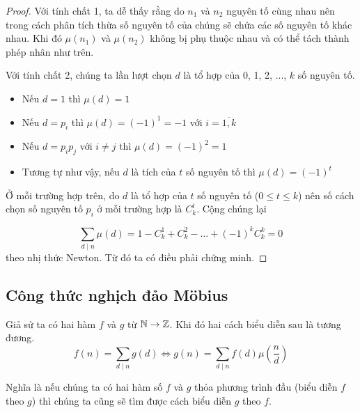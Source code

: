 \begin{proof}
    Với tính chất 1, ta dễ thấy rằng do $n_1$ và $n_2$ nguyên tố cùng nhau nên trong
    cách phân tích thừa số nguyên tố của chúng sẽ chứa các số nguyên tố khác nhau. 
    Khi đó $\mu(n_1)$ và $\mu(n_2)$ không bị phụ thuộc nhau và có thể tách thành phép
    nhân như trên.

    Với tính chất 2, chúng ta lần lượt chọn $d$ là tổ hợp của 0, 1, 2, ..., $k$
    số nguyên tố.

    \begin{itemize}
        \item Nếu $d = 1$ thì $\mu(d) = 1$
        \item Nếu $d = p_i$ thì $\mu(d) = (-1)^1 = -1$ với $i = \overline{1, k}$
        \item Nếu $d = p_i p_j$ với $i \neq j$ thì $\mu (d) = (-1)^2 = 1$
        \item Tương tự như vậy, nếu $d$ là tích của $t$ số nguyên tố thì
        $\mu (d) = (-1)^t$
    \end{itemize}

    Ở mỗi trường hợp trên, do $d$ là tổ hợp của $t$ số nguyên tố ($0 \leqslant t \leqslant k$)
    nên số cách chọn số nguyên tố $p_i$ ở mỗi trường hợp là $C^t_k$. Cộng chúng lại

    \[\sum_{d \mid n} \mu(d) = 1 - C^1_k + C^2_k - \ldots + (-1)^k C^k_k = 0\]
    theo nhị thức Newton. Từ đó ta có điều phải chứng minh.
\end{proof}

\subsection*{Công thức nghịch đảo Möbius}

Giả sử ta có hai hàm $f$ và $g$ từ $\mathbb{N} \to \mathbb{Z}$. Khi đó hai cách biểu diễn sau
là tương đương.
\begin{equation}
    f(n) = \sum_{d \mid n} g(d) \Leftrightarrow g(n) 
    = \sum_{d \mid n} f(d) \mu\left(\frac{n}{d}\right)
\end{equation}

Nghĩa là nếu chúng ta có hai hàm số $f$ và $g$ thỏa phương trình đầu (biểu diễn
$f$ theo $g$) thì chúng ta cũng sẽ tìm được cách biểu diễn $g$ theo $f$.

